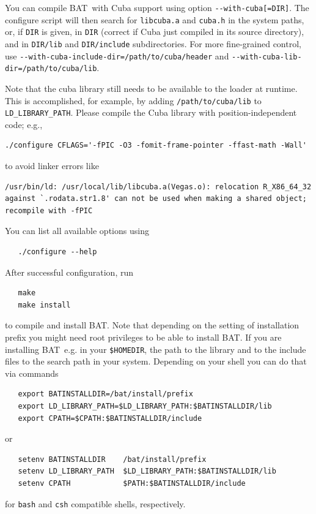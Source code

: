 \documentclass[11pt, a4paper]{article}
\newcommand{\bat}{{\sc BAT}}
\newcommand{\BAT}{\bat}
\begin{document}
You can compile \BAT\ with Cuba support using option
\verb|--with-cuba[=DIR]|.  The configure script will then search for
\verb|libcuba.a| and \verb|cuba.h| in the system paths, or, if
\verb|DIR| is given, in \verb|DIR| (correct if Cuba just compiled in
its source directory), and in \verb|DIR/lib| and \verb|DIR/include|
subdirectories. For more fine-grained control, use
\verb|--with-cuba-include-dir=/path/to/cuba/header| and
\verb|--with-cuba-lib-dir=/path/to/cuba/lib|.

Note that the cuba library still needs to be available to the loader
at runtime. This is accomplished, for example, by adding
\verb|/path/to/cuba/lib| to \verb|LD_LIBRARY_PATH|. Please compile the Cuba library
with position-independent code; e.g.,
\begin{verbatim}
./configure CFLAGS='-fPIC -O3 -fomit-frame-pointer -ffast-math -Wall'
\end{verbatim}
to avoid linker errors like
\begin{verbatim}
/usr/bin/ld: /usr/local/lib/libcuba.a(Vegas.o): relocation R_X86_64_32
against `.rodata.str1.8' can not be used when making a shared object;
recompile with -fPIC
\end{verbatim}

You can list all available options using
%
\begin{verbatim}
   ./configure --help
\end{verbatim}


After successful configuration, run
%
\begin{verbatim}
   make
   make install
\end{verbatim}
%
to compile and install \bat. Note that depending on the setting of
installation prefix you might need root privileges to be able to
install \bat. If you are installing \bat\ e.g. in your
\verb|$HOMEDIR|, %
the path to the library and to the include files to the search path in
your system. Depending on your shell you can do that via commands
%
\begin{verbatim}
   export BATINSTALLDIR=/bat/install/prefix
   export LD_LIBRARY_PATH=$LD_LIBRARY_PATH:$BATINSTALLDIR/lib
   export CPATH=$CPATH:$BATINSTALLDIR/include
\end{verbatim}
%
or
%
\begin{verbatim}
   setenv BATINSTALLDIR    /bat/install/prefix
   setenv LD_LIBRARY_PATH  $LD_LIBRARY_PATH:$BATINSTALLDIR/lib
   setenv CPATH            $PATH:$BATINSTALLDIR/include
\end{verbatim}
%
for \verb|bash| and \verb|csh| compatible shells, respectively.
\end{document}
